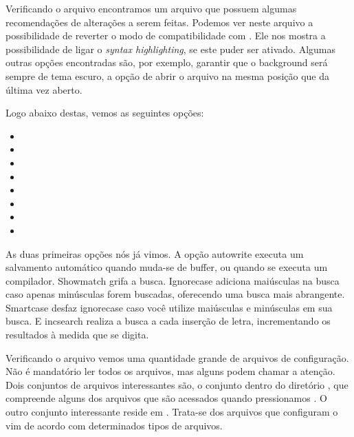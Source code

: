 
Verificando o arquivo  encontramos um arquivo que possuem algumas
recomendações de alterações a serem feitas.
Podemos ver neste arquivo a possibilidade de reverter o modo de compatibilidade com .
Ele nos mostra a possibilidade de ligar o \emph{syntax highlighting}, se este puder ser ativado.
Algumas outras opções encontradas são, por exemplo, garantir que o background será sempre de tema escuro,
a opção de abrir o arquivo na mesma posição que da última vez aberto.


Logo abaixo destas, vemos as seguintes opções:
\begin{multicols}{3}
\begin{itemize}
	\item {}
	\item {}
	\item {}
	\item {}
	\item {}
	\item {}
	\item {}
	\item {}
\end{itemize}
\end{multicols}


As duas primeiras opções nós já vimos.
A opção autowrite executa um salvamento automático quando muda-se de buffer,
ou quando se executa um compilador.
Showmatch grifa a busca.
Ignorecase adiciona maiúsculas na busca caso apenas minúsculas forem buscadas,
oferecendo uma busca mais abrangente.
Smartcase desfaz ignorecase caso você utilize maiúsculas e minúsculas em sua busca.
E incsearch realiza a busca a cada inserção de letra, incrementando os resultados à medida que se digita.

Verificando o arquivo  vemos uma quantidade grande de arquivos de configuração.
Não é mandatório ler todos os arquivos, mas alguns podem chamar a atenção.
Dois conjuntos de arquivos interessantes são, o conjunto dentro do diretório , que compreende
alguns dos arquivos que são acessados quando pressionamos .
O outro conjunto interessante reside em .
Trata-se dos arquivos que configuram o vim de acordo com determinados tipos de arquivos.

